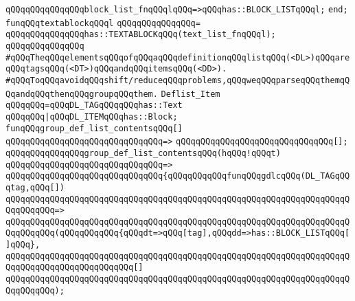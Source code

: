 \verb|qQQqqQQqqQQqqQQqblock_list_fnqQQqlqQQq=>qQQqhas::BLOCK_LISTqQQql;|\newline
\verb|end;|\newline
\newline
\verb|funqQQqtextablockqQQql|\newline
\verb|qQQqqQQqqQQqqQQq=|\newline
\verb|qQQqqQQqqQQqqQQqhas::TEXTABLOCKqQQq(text_list_fnqQQql);|\newline
\verb|qQQqqQQqqQQqqQQq|\newline
\verb|#qQQqTheqQQqelementsqQQqofqQQqaqQQqdefinitionqQQqlistqQQq(<DL>)qQQqareqQQqtagsqQQq(<DT>)qQQqandqQQqitemsqQQq(<DD>).|\newline
\verb|#qQQqToqQQqavoidqQQqshift/reduceqQQqproblems,qQQqweqQQqparseqQQqthemqQQqandqQQqthenqQQqgroupqQQqthem.|\newline
\newline
\newline
\verb|Deflist_Item|\newline
\verb|qQQqqQQq=qQQqDL_TAGqQQqqQQqhas::Text|\newline
\verb|qQQqqQQq|\verb#|qQQqDL_ITEMqQQqhas::Block;#\newline
\newline
\verb|funqQQqgroup_def_list_contentsqQQq[]|\newline
\verb|qQQqqQQqqQQqqQQqqQQqqQQqqQQqqQQq=>|\newline
\verb|qQQqqQQqqQQqqQQqqQQqqQQqqQQqqQQq[];|\newline
\newline
\verb|qQQqqQQqqQQqqQQqgroup_def_list_contentsqQQq(hqQQq!qQQqt)|\newline
\verb|qQQqqQQqqQQqqQQqqQQqqQQqqQQqqQQq=>|\newline
\verb|qQQqqQQqqQQqqQQqqQQqqQQqqQQqqQQq{qQQqqQQqqQQqfunqQQqgdlcqQQq(DL_TAGqQQqtag,qQQq[])|\newline
\verb|qQQqqQQqqQQqqQQqqQQqqQQqqQQqqQQqqQQqqQQqqQQqqQQqqQQqqQQqqQQqqQQqqQQqqQQqqQQqqQQq=>|\newline
\verb|qQQqqQQqqQQqqQQqqQQqqQQqqQQqqQQqqQQqqQQqqQQqqQQqqQQqqQQqqQQqqQQqqQQqqQQqqQQqqQQq(qQQqqQQqqQQq{qQQqdt=>qQQq[tag],qQQqdd=>has::BLOCK_LISTqQQq[]qQQq},|\newline
\verb|qQQqqQQqqQQqqQQqqQQqqQQqqQQqqQQqqQQqqQQqqQQqqQQqqQQqqQQqqQQqqQQqqQQqqQQqqQQqqQQqqQQqqQQqqQQqqQQq[]|\newline
\verb|qQQqqQQqqQQqqQQqqQQqqQQqqQQqqQQqqQQqqQQqqQQqqQQqqQQqqQQqqQQqqQQqqQQqqQQqqQQqqQQq);|\newline
\newline
